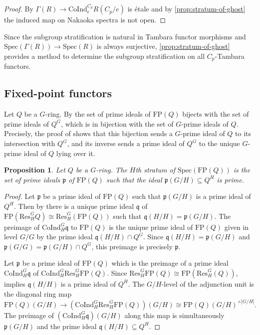 \documentclass[11pt,dvipsnames]{amsart}
\newcommand{\p}{\mathfrak{p}}
\newcommand{\q}{\mathfrak{q}}
\newtheorem{proposition}[theorem]{Proposition}
\theoremstyle{BoldRemark}
\newcommand{\Res}{\mathrm{Res}}
\newcommand{\Spec}{\mathrm{Spec}}
\newcommand{\Coind}{\mathrm{CoInd}}
\newcommand{\FP}{\mathrm{FP}}
\renewcommand{\subset}{\subseteq}
\newcommand{\ghost}{\Gamma}
\begin{document}
\begin{proof}
    By \cite[Theorem A]{Wis25c} $\ghost(R) \rightarrow \Coind_e^{C_p} R(C_p/e)$ is \'{e}tale and by \cref{prop:stratum-of-ghost} the induced map on Nakaoka spectra is not open.
\end{proof}

Since the subgroup stratification is natural in Tambara functor morphisms and $\Spec(\ghost (R)) \rightarrow \Spec(R)$ is always surjective, \cref{prop:stratum-of-ghost} provides a method to determine the subgroup stratification on all $C_p$-Tambara functors.

\subsection{Fixed-point functors}

Let $Q$ be a $G$-ring. By \cite[Proposition 6.4]{4DS} the set of prime ideals of $\FP(Q)$ bijects with the set of prime ideals of $Q^G$, which is in bijection with the set of $G$-prime ideals of $Q$. Precisely, the proof of \cite[Proposition 6.4]{4DS} shows that this bijection sends a $G$-prime ideal of $Q$ to its intersection with $Q^G$, and its inverse sends a prime ideal of $Q^G$ to the unique $G$-prime ideal of $Q$ lying over it.

\begin{proposition}\label{prop:subgroup-strata-for-MRC}
    Let $Q$ be a $G$-ring. The $H$th stratum of $\Spec(\FP(Q))$ is the set of prime ideals $\p$ of $\FP(Q)$ such that the ideal $\p(G/H) \subset Q^H$ is prime.
\end{proposition}

\begin{proof}
    Let $\p$ be a prime ideal of $\FP(Q)$ such that $\p(G/H)$ is a prime ideal of $Q^H$. Then by \cite[Proposition 6.4]{4DS} there is a unique prime ideal $\q$ of $\FP(\Res_H^G Q) \cong \Res_H^G(\FP(Q))$ such that $\q(H/H) = \p(G/H)$. The preimage of $\Coind_H^G \q$ to $\FP(Q)$ is the unique prime ideal of $\FP(Q)$ given in level $G/G$ by the prime ideal $\q(H/H) \cap Q^G$. Since $\q(H/H) = \p(G/H)$ and $\p(G/G) = \p(G/H) \cap Q^G$, this preimage is precisely $\p$.
    
    Let $\p$ be a prime ideal of $\FP(Q)$ which is the preimage of a prime ideal $\Coind_H^G \q$ of $\Coind_H^G \Res_H^G \FP(Q)$. Since $\Res_H^G \FP(Q) \cong \FP(\Res_H^G(Q))$, \cite[Proposition 6.4]{4DS} implies $\q(H/H)$ is a prime ideal of $Q^H$. The $G/H$-level of the adjunction unit is the diagonal ring map
    \[ 
        \FP(Q)(G/H) \rightarrow (\Coind_H^G \Res_H^G \FP(Q))(G/H) \cong \FP(Q)(G/H)^{\times |G/H|} .
    \] 
    The preimage of $(\Coind_H^G \q)(G/H)$ along this map is simultaneously $\p(G/H)$ and the prime ideal $\q(H/H) \subset Q^H$.
\end{proof}
\end{document}
